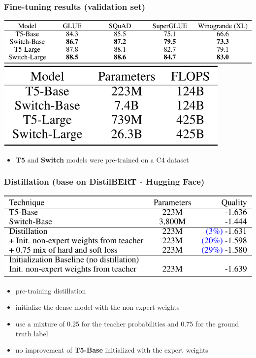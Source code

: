 \documentclass{beamer}
\begin{document}
\begin{frame}
    \frametitle{Fine-tuning results (validation set)}
    \begin{center}
        \includegraphics[scale=0.34]{img/switch_transformers_glue.png}
        \includegraphics[scale=0.35]{img/switch_transformers_flops.png}
        \begin{itemize}
            \item \textbf{T5} and \textbf{Switch} models were pre-trained on a C4 dataset
        \end{itemize}
    \end{center}
\end{frame}

\begin{frame}
    \frametitle{Distillation (base on DistilBERT - Hugging Face)}
    \begin{center}
        \includegraphics[scale=0.34]{img/switch_transformers_distilled.png}
        \begin{itemize}
            \item pre-training distillation
            \item initialize the dense model with the non-expert weights
            \item use a mixture of 0.25 for the teacher probabilities and 0.75 for the ground truth label
            \item no improvement of \textbf{T5-Base} initialized with the expert weights
        \end{itemize}
    \end{center}
\end{frame}
\end{document}
